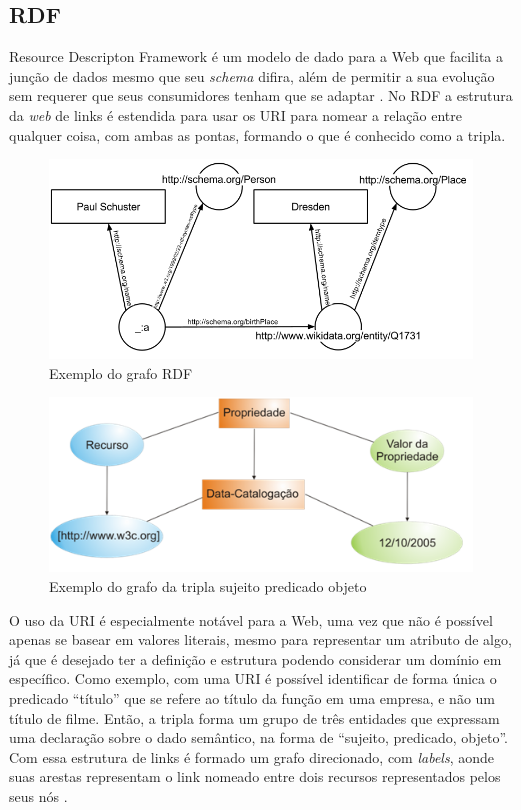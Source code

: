 \subsection{RDF}

Resource Descripton Framework é um modelo de dado para a Web que facilita a junção de dados mesmo que seu \textit{schema} difira, além de permitir a sua evolução sem requerer que seus consumidores tenham que se adaptar \citep{W3CRDF}. No RDF a estrutura da \textit{web} de links é estendida para usar os \ac{URI} para nomear a relação entre qualquer coisa, com ambas as pontas, formando o que é conhecido como a tripla.

\begin{figure}
	\centering
	\includegraphics[scale=0.40]{imagens/rdf_example1.png}
	\caption{Exemplo do grafo RDF \citep{RDFWikiImage}}
	\label{fig:rdf_graph}
\end{figure}

\begin{figure}
	\centering
	\includegraphics[scale=0.65]{imagens/rdf_example2.png}
	\caption{Exemplo do grafo da tripla sujeito predicado objeto \citep{WebSemanticaDevmedia}}
	\label{fig:rdf_graph2}
\end{figure}

O uso da URI é especialmente notável para a Web, uma vez que não é possível apenas se basear em valores literais, mesmo para representar um atributo de algo, já que é desejado ter a definição e estrutura podendo considerar um domínio em específico. Como exemplo, com uma URI é possível identificar de forma única o predicado “título” que se refere ao título da função em uma empresa, e não um título de filme. Então, a tripla forma um grupo de três entidades que expressam uma declaração sobre o dado semântico, na forma de “sujeito, predicado, objeto”. Com essa estrutura de links é formado um grafo direcionado, com \textit{labels}, aonde suas arestas representam o link nomeado entre dois recursos representados pelos seus nós \citep{W3CRDF}.

